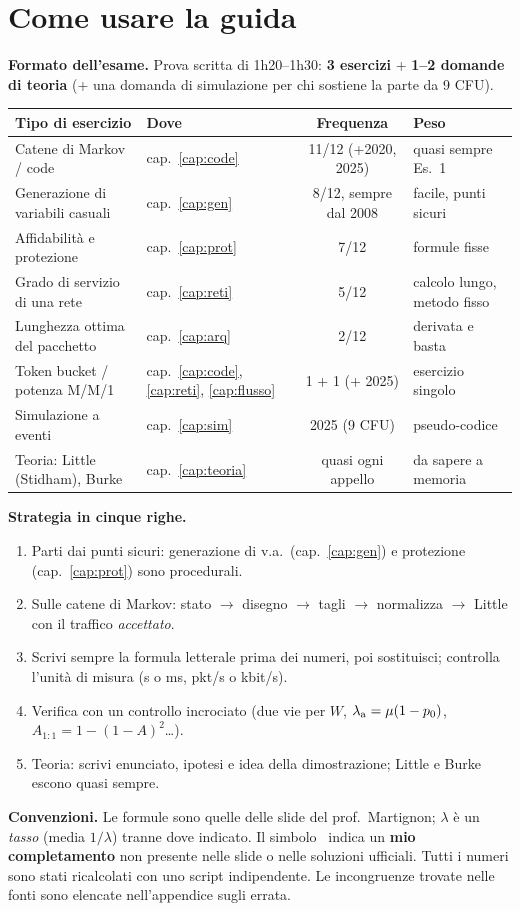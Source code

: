 \chapter*{Come usare la guida}

\textbf{Formato dell'esame.} Prova scritta di 1h20--1h30: \textbf{3 esercizi} + \textbf{1--2 domande di teoria} (+ una domanda di simulazione per chi sostiene la parte da 9 CFU).

\begin{center}\small
\begin{tabularx}{\linewidth}{Xlcl}
\toprule
Tipo di esercizio & Dove & Frequenza & Peso\\
\midrule
Catene di Markov / code & cap.~\ref{cap:code} & 11/12 (+2020, 2025) & quasi sempre Es.~1\\
Generazione di variabili casuali & cap.~\ref{cap:gen} & 8/12, sempre dal 2008 & facile, punti sicuri\\
Affidabilità e protezione & cap.~\ref{cap:prot} & 7/12 & formule fisse\\
Grado di servizio di una rete & cap.~\ref{cap:reti} & 5/12 & calcolo lungo, metodo fisso\\
Lunghezza ottima del pacchetto & cap.~\ref{cap:arq} & 2/12 & derivata e basta\\
Token bucket / potenza M/M/1 & cap.~\ref{cap:code}, \ref{cap:reti}, \ref{cap:flusso} & 1 + 1 (+ 2025) & esercizio singolo\\
Simulazione a eventi & cap.~\ref{cap:sim} & 2025 (9 CFU) & pseudo-codice\\
Teoria: Little (Stidham), Burke & cap.~\ref{cap:teoria} & quasi ogni appello & da sapere a memoria\\
\bottomrule
\end{tabularx}
\end{center}

\textbf{Strategia in cinque righe.}
\begin{enumerate}[nosep]
\item Parti dai punti sicuri: generazione di v.a.\ (cap.~\ref{cap:gen}) e protezione (cap.~\ref{cap:prot}) sono procedurali.
\item Sulle catene di Markov: stato $\to$ disegno $\to$ tagli $\to$ normalizza $\to$ Little con il traffico \emph{accettato}.
\item Scrivi sempre la formula letterale prima dei numeri, poi sostituisci; controlla l'unità di misura (s o ms, pkt/s o kbit/s).
\item Verifica con un controllo incrociato (due vie per $W$, $\lambda_{\mathrm{a}}=\mu(1-p_0)$, $A_{1:1}=1-(1-A)^2$\dots).
\item Teoria: scrivi enunciato, ipotesi e idea della dimostrazione; Little e Burke escono quasi sempre.
\end{enumerate}

\textbf{Convenzioni.} Le formule sono quelle delle slide del prof.\ Martignon; $\lambda$ è un \emph{tasso} (media $1/\lambda$) tranne dove indicato. Il simbolo \mio\ indica un \textbf{mio completamento} non presente nelle slide o nelle soluzioni ufficiali. Tutti i numeri sono stati ricalcolati con uno script indipendente. Le incongruenze trovate nelle fonti sono elencate nell'appendice sugli errata.
